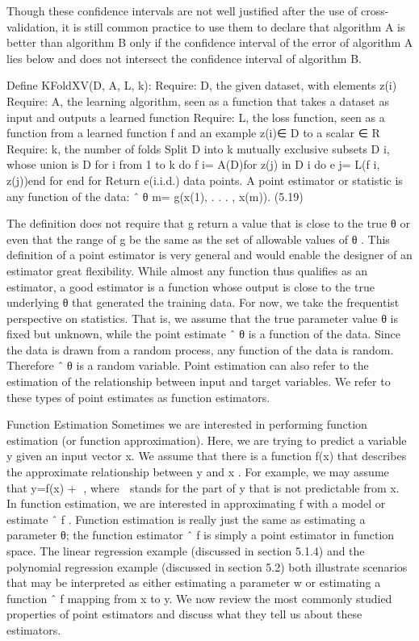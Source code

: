 \documentclass[11pt]{article}
\begin{document}
Though these conﬁdence intervals are not well justiﬁed after the use of cross-validation, it is still common practice to use them to declare
that algorithm A is better than algorithm B only if the conﬁdence interval of the error of algorithm
A lies below and does not intersect the conﬁdence interval of algorithm B.

Deﬁne KFoldXV(D, A, L, k):
Require: D, the given dataset, with elements z(i)
Require: A, the learning algorithm, seen as a function that takes a dataset as input and outputs a learned function
Require: L, the loss function, seen as a function from a learned function f and an example z(i)∈ D to a scalar ∈ R
Require: k, the number of folds Split D into k mutually exclusive subsets D i, whose union is D for i from 1 to k do f i= A(D\Di)for z(j) in D i do e j= L(f i, z(j))end for end for Return e(i.i.d.) data points.
A point estimator or statistic is any function of the data:
ˆ θ m= g(x(1), . . . , x(m)). (5.19)

The deﬁnition does not require that g return a value that is close to the true θ or even that the range of
g be the same as the set of allowable values of θ .
This deﬁnition of a point estimator is very general and would enable the designer of an estimator great ﬂexibility.
While almost any function thus qualiﬁes as an estimator, a good estimator is a function whose output is close to the true underlying θ that generated the training data.
For now, we take the frequentist perspective on statistics.
That is, we assume that the true parameter value θ is ﬁxed but unknown, while the point estimate ˆ θ is a function of the data.
Since the data is drawn from a random process, any function of the data is random.
Therefore ˆ θ is a random variable.
Point estimation can also refer to the estimation of the relationship between input and target variables.
We refer to these types of point estimates as function estimators.

Function Estimation
Sometimes we are interested in performing function estimation (or function approximation).
Here, we are trying to predict a variable y given an input vector x.
We assume that there is a function f(x) that describes the approximate relationship between y and x .
For example, we may assume that y=f(x) + , where  stands for the part of y that is not predictable from x.
In function estimation, we are interested in approximating f with a model or estimate ˆ f .
Function estimation is really just the same as estimating a parameter θ; the function estimator ˆ f is simply a point estimator in function space.
The linear regression example (discussed in section 5.1.4) and the polynomial regression example (discussed in section 5.2) both illustrate scenarios that may be interpreted as either estimating a parameter w or estimating a function ˆ f mapping from x to y.
We now review the most commonly studied properties of point estimators and discuss what they tell us about these estimators.
\end{document}
